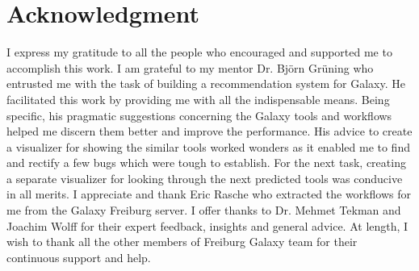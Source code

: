 \chapter*{Acknowledgment}

I express my gratitude to all the people who encouraged and supported me to accomplish this work. I am grateful to my mentor Dr. Björn Grüning who entrusted me with the task of building a recommendation system for Galaxy. He facilitated this work by providing me with all the indispensable means. Being specific, his pragmatic suggestions concerning the Galaxy tools and workflows helped me discern them better and improve the performance. His advice to create a visualizer for showing the similar tools worked wonders as it enabled me to find and rectify a few bugs which were tough to establish. For the next task, creating a separate visualizer for looking through the next predicted tools was conducive in all merits. I appreciate and thank Eric Rasche who extracted the workflows for me from the Galaxy Freiburg server. I offer thanks to Dr. Mehmet Tekman and Joachim Wolff for their expert feedback, insights and general advice. At length, I wish to thank all the other members of Freiburg Galaxy team for their continuous support and help.

